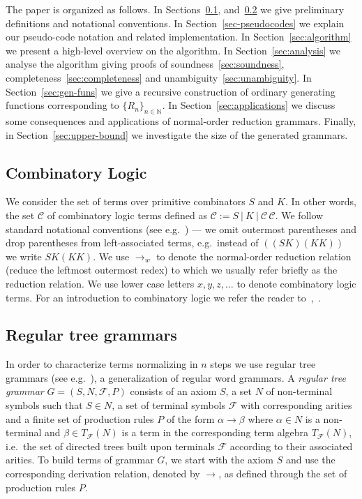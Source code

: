 \documentclass[11pt,a4paper]{amsart}
\theoremstyle{definition}
\begin{document}
The paper is organized as follows. In Sections~\ref{sec:combinatory-logic}, and~\ref{sec:regular-tree-grammars} we give preliminary definitions and notational conventions. In Section~\ref{sec-pseudocodes} we explain our pseudo-code notation and related implementation. In Section~\ref{sec:algorithm} we present a high-level overview on the algorithm. In Section~\ref{sec:analysis} we analyse the algorithm giving proofs of soundness~\ref{sec:soundness}, completeness~\ref{sec:completeness} and unambiguity~\ref{sec:unambiguity}. In Section~\ref{sec:gen-funs} we give a recursive construction of ordinary generating functions corresponding to ${\{R_n\}}_{n \in \mathbb{N}}$. In Section~\ref{sec:applications} we discuss some consequences and applications of normal-order reduction grammars. Finally, in Section~\ref{sec:upper-bound} we investigate the size of the generated grammars.

\subsection{Combinatory Logic}\label{sec:combinatory-logic}
We consider the set of terms over primitive combinators $S$ and $K$. In other words, the set $\mathcal{C}$ of combinatory logic terms defined as $\mathcal{C} := S~|~K~|~\mathcal{C}\, \mathcal{C}$. We follow standard notational conventions (see e.g.~\cite{barendregt1984}) --- we omit outermost parentheses and drop parentheses from left-associated terms, e.g.~instead of $((S K) (K K))$ we write $S K (K K)$. We use $\to_w$ to denote the normal-order reduction relation (reduce the leftmost outermost redex) to which we usually refer briefly as the reduction relation. We use lower case letters $x,y,z,\ldots$ to denote combinatory logic terms. For an introduction to combinatory logic we refer the
reader to~\cite{barendregt1984},~\cite{curry-feys1958}.

\subsection{Regular tree grammars}\label{sec:regular-tree-grammars}
In order to characterize terms normalizing in $n$ steps we use
regular tree grammars (see e.g.~\cite{tata2007}), a generalization of regular
word grammars. A \emph{regular tree grammar}
$G = (S, N, \mathcal{F}, P)$ consists of an axiom $S$, a set $N$ of non-terminal
symbols such that $S \in N$, a set of terminal symbols $\mathcal{F}$ with
corresponding arities and a finite set of production rules $P$ of the form
$\alpha \to \beta$ where $\alpha \in N$ is a non-terminal and $\beta \in
T_{\mathcal{F}}(N)$ is a term in the corresponding term algebra
$T_{\mathcal{F}}(N)$, i.e.~the set of directed trees built upon terminals
$\mathcal{F}$ according to their associated arities. To build terms of grammar
$G$, we start with the axiom $S$ and use the corresponding derivation relation,
denoted by $\to$, as defined through the set of production rules $P$.
\end{document}
